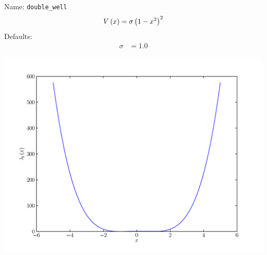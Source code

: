 \documentclass[a4paper,10pt]{report}
\begin{document}
\begin{minipage}{0.5\linewidth}
  Name:    \texttt{double\_well}
  \begin{equation*}
    V\left( x \right) = \sigma \left(1 - x^{2}\right)^{2}
  \end{equation*}
  Defaults:
  \begin{align*}
    \sigma & = 1.0
  \end{align*}
\end{minipage}
\begin{minipage}{0.5\linewidth}
  \begin{center}
    \includegraphics[scale=0.25]{./fig/double_well.pdf}
  \end{center}
\end{minipage}
\end{document}
